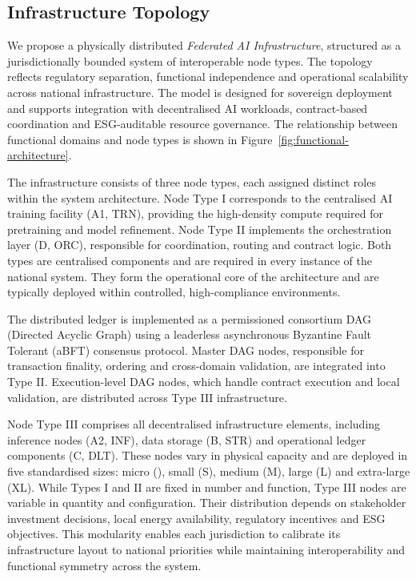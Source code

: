 \documentclass[oneside,10pt]{swissi}
\begin{document}
\subsection{Infrastructure Topology}
\label{subsec:infrastructure-topology}

We propose a physically distributed \textit{Federated AI Infrastructure}, structured as a jurisdictionally bounded system of interoperable node types. The topology reflects regulatory separation, functional independence and operational scalability across national infrastructure. The model is designed for sovereign deployment and supports integration with decentralised AI workloads, contract-based coordination and ESG-auditable resource governance. The relationship between functional domains and node types is shown in Figure~\ref{fig:functional-architecture}.

The infrastructure consists of three node types, each assigned distinct roles within the system architecture. Node Type I corresponds to the centralised AI training facility (A1, TRN), providing the high-density compute required for pretraining and model refinement. Node Type II implements the orchestration layer (D, ORC), responsible for coordination, routing and contract logic. Both types are centralised components and are required in every instance of the national system. They form the operational core of the architecture and are typically deployed within controlled, high-compliance environments.

The distributed ledger is implemented as a permissioned consortium DAG (Directed Acyclic Graph) using a leaderless asynchronous Byzantine Fault Tolerant (aBFT) consensus protocol. Master DAG nodes, responsible for transaction finality, ordering and cross-domain validation, are integrated into Type II. Execution-level DAG nodes, which handle contract execution and local validation, are distributed across Type III infrastructure.

Node Type III comprises all decentralised infrastructure elements, including inference nodes (A2, INF), data storage (B, STR) and operational ledger components (C, DLT). These nodes vary in physical capacity and are deployed in five standardised sizes: micro (\textmu), small (S), medium (M), large (L) and extra-large (XL). While Types I and II are fixed in number and function, Type III nodes are variable in quantity and configuration. Their distribution depends on stakeholder investment decisions, local energy availability, regulatory incentives and ESG objectives. This modularity enables each jurisdiction to calibrate its infrastructure layout to national priorities while maintaining interoperability and functional symmetry across the system.
\end{document}
